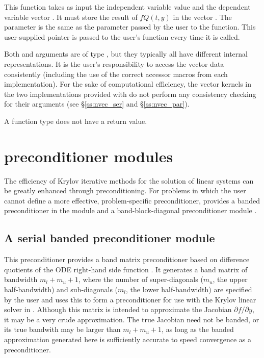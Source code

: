 This function takes as input the independent variable value 
and the dependent variable vector . It must store the
result of $fQ(t,y)$ in the vector . 
The  parameter is the same as the  parameter passed by 
the user to the  function. This user-supplied pointer is passed to 
the user's  function every time it is called.

Both  and  arguments are of type ,
but they  typically all have different internal representations. It is the user's 
responsibility to access the vector data consistently (including the use of the 
correct accessor macros from each {\nvector} implementation). For the sake of 
computational efficiency, the vector kernels in the two {\nvector} implementations 
provided with {\cvodes} do not perform any consistency checking for their 
 arguments (see \S\ref{ss:nvec_ser} and \S\ref{ss:nvec_par}).

A  function type does not have a return value.

\section{{\cvodes} preconditioner modules}\label{ss:preconds}

The efficiency of Krylov iterative methods for the solution of linear systems 
can be greatly enhanced through preconditioning. For problems in which the 
user cannot define a more effective, problem-specific preconditioner,
{\cvodes} provides a banded preconditioner in the module {\cvbandpre} and
a band-block-diagonal preconditioner module {\cvbbdpre}.

\subsection{A serial banded preconditioner module}\label{sss:cvbandpre}

This preconditioner provides a band matrix preconditioner based on
difference quotients of the ODE right-hand side function .
It generates a band matrix of bandwidth $m_l + m_u + 1$, where
the number of super-diagonals ($m_u$, the upper half-bandwidth) and
sub-diagonals ($m_l$, the lower half-bandwidth) are specified by
the user and uses this to form a preconditioner for use with the Krylov
linear solver in {\cvspgmr}.  Although this matrix is intended
to approximate the Jacobian $\partial f / \partial y$, 
it may be a very crude approximation.  The true Jacobian need not be banded, or its
true bandwith may be larger than $m_l + m_u + 1$, as long as the
banded approximation generated here is sufficiently accurate
to speed convergence as a preconditioner. 

